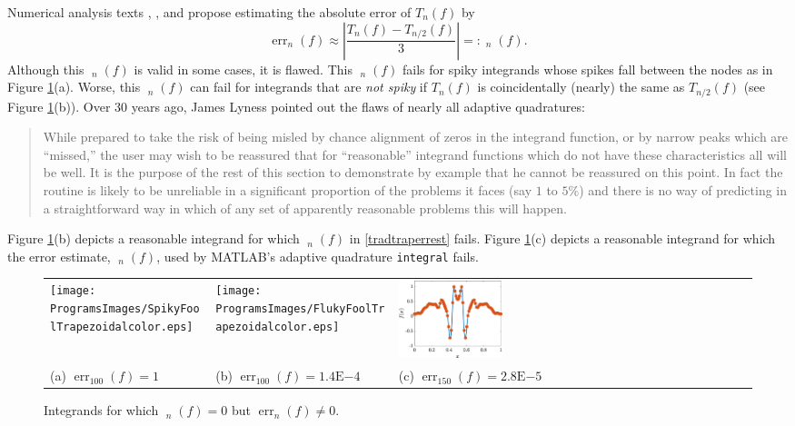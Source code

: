 \documentclass[11pt]{NSFamsart}
\DeclareMathOperator{\err}{err}
\DeclareMathOperator{\herr}{\widehat{\err}}
\def\abs#1{\ensuremath{\left \lvert #1 \right \rvert}}
\begin{document}
Numerical analysis texts  \cite[p.\ 223--224]{BurFai10}, \cite[p.\ 233]{CheKin12a}, 
and  \cite[p.\ 270]{Sau12a} propose estimating the absolute error of $T_n(f)$ by 
\begin{equation} \label{tradtraperrest}
 \err_n(f) \approx  \abs{\frac{T_n(f) - T_{n/2}(f)}{3}} =: \herr_n(f).
\end{equation}
Although this $\herr_n(f)$ is valid in some cases, it is flawed.  This $\herr_n(f)$  fails for 
spiky integrands whose 
spikes fall  between the nodes as in Figure \ref{quadfailfig}(a).  Worse, this $\herr_n(f)$ can fail 
for 
integrands that are \emph{not spiky} if $T_n(f)$ is coincidentally (nearly) 
the same as  $T_{n/2}(f)$ (see Figure \ref{quadfailfig}(b)).  Over 30 years ago, James 
Lyness \cite[p.\ 69]{Lyn83} pointed out the flaws of nearly all adaptive quadratures:
\begin{quote}
	While prepared to take the risk of being misled by chance alignment of zeros in the integrand 
	function, or by narrow peaks which are ``missed,'' the user may wish to be reassured that for 
	``reasonable'' integrand functions which do not have these characteristics all will be well. It is the 
	purpose of the rest of this section to demonstrate by example that he cannot be reassured on this 
	point. In fact the routine is likely to be unreliable in a significant proportion of the problems it faces 
	(say $1$ to $5\%$) and there is no way of predicting in a straightforward way in which of any set 
	of apparently reasonable problems this will happen.
\end{quote}
Figure \ref{quadfailfig}(b) depicts a reasonable integrand for which $\herr_n(f)$ in 
\eqref{tradtraperrest} fails.  Figure 
\ref{quadfailfig}(c) depicts a reasonable integrand for which the error estimate, $\herr_n(f)$, 
used 
by  
MATLAB's adaptive quadrature 
\texttt{integral} \cite{MAT9.3} fails.  

\begin{figure}[h]
	\begin{tabular}{>{\centering}m{}@{\quad}>{\centering}m{}@{\quad}>{\centering}m{}}
		\texttt{[image: ProgramsImages/SpikyFoolTrapezoidalcolor.eps]} &
		\texttt{[image: ProgramsImages/FlukyFoolTrapezoidalcolor.eps]} &
		\includegraphics[width=0.3\textwidth]{ProgramsImages/FlukyFoolIntegralcolor.eps} 
		\tabularnewline
		(a) $\err_{100}(f) = 1 $ &
		(b) $\err_{100}(f) =  1.4\text{E}{-4}$ &
		(c) $\err_{150}(f) =  2.8\text{E}{-5}$
		\end{tabular}
	\caption{Integrands for which $\herr_n(f) = 0$ but 
	$\err_n(f) \ne 0$. \label{quadfailfig}}
\end{figure}
\end{document}
